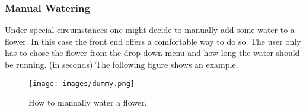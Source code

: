 \subsubsection{Manual Watering}
Under special circumstances one might decide to manually add some water to a flower. In this case the front end offers a comfortable way to do so.
The user only has to chose the flower from the drop down menu and how long the water should be running. (in seconds)
The following figure shows an example.

\begin{figure}[h!]
	\begin{center}
	\texttt{[image: images/dummy.png]}
	\caption{How to manually water a flower.}
	\label{fig:manual_watering}
	\end{center}
\end{figure}
